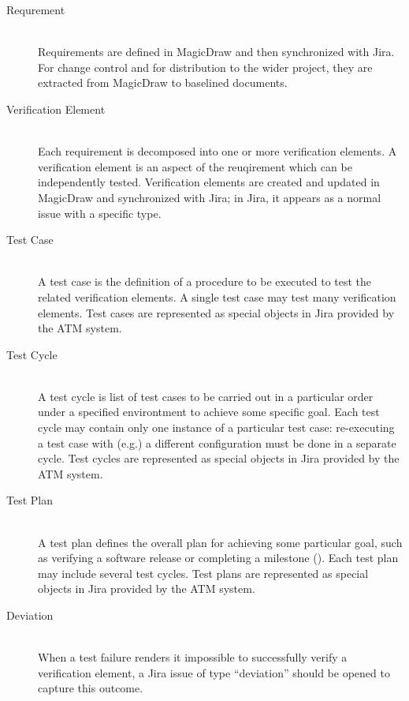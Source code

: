 \begin{description}

\item[Requrement] \hfill \\
Requirements are defined in MagicDraw and then synchronized with Jira.
For change control and for distribution to the wider project, they are extracted from MagicDraw to baselined documents.

\item[Verification Element] \hfill \\
Each requirement is decomposed into one or more verification elements.
A verification element is an aspect of the reuqirement which can be independently tested.
Verification elements are created and updated in MagicDraw and synchronized with Jira; in Jira, it appears as a normal issue with a specific type.

\item[Test Case] \hfill \\
A test case is the definition of a procedure to be executed to test the related verification elements.
A single test case may test many verification elements.
Test cases are represented as special objects in Jira provided by the ATM system.

\item[Test Cycle] \hfill \\
A test cycle is list of test cases to be carried out in a particular order under a specified environtment to achieve some specific goal.
Each test cycle may contain only one instance of a particular test case: re-executing a test case with (e.g.) a different configuration must be done in a separate cycle.
Test cycles are represented as special objects in Jira provided by the ATM system.

\item[Test Plan] \hfill \\
A test plan defines the overall plan for achieving some particular goal, such as verifying a software release or completing a milestone ().
Each test plan may include several test cycles.
Test plans are represented as special objects in Jira provided by the ATM system.

\item[Deviation] \hfill \\
When a test failure renders it impossible to successfully verify a verification element, a Jira issue of type ``deviation'' should be opened to capture this outcome.

\end{description}

